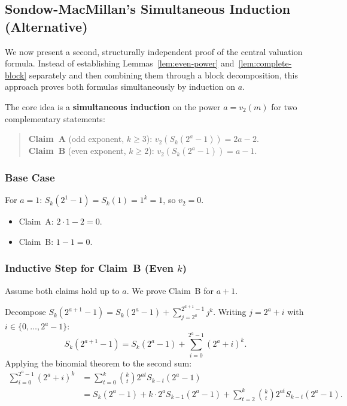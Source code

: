 \documentclass[12pt,a4paper]{article}
\theoremstyle{plain}
\theoremstyle{definition}
\begin{document}
\subsection{Sondow-MacMillan's Simultaneous Induction (Alternative)}
\label{sec:induction}

We now present a second, structurally independent proof of the central
valuation formula.  Instead of establishing Lemmas~\ref{lem:even-power}
and~\ref{lem:complete-block} separately and then combining them through a
block decomposition, this approach proves both formulas simultaneously
by induction on $a$.

The core idea is a \textbf{simultaneous induction} on the power $a = v_2(m)$
for two complementary statements:

\begin{quote}
  \textbf{Claim~A} (odd exponent, $k \ge 3$):
  $v_2(S_k(2^a - 1)) = 2a - 2$. \\[2pt]
  \textbf{Claim~B} (even exponent, $k \ge 2$):
  $v_2(S_k(2^a - 1)) = a - 1$.
\end{quote}

\subsubsection{Base Case}

For $a = 1$: $S_k(2^1 - 1) = S_k(1) = 1^k = 1$, so $v_2 = 0$.
\begin{itemize}[nosep]
  \item Claim~A: $2 \cdot 1 - 2 = 0$.~\checkmark
  \item Claim~B: $1 - 1 = 0$.~\checkmark
\end{itemize}

\subsubsection{Inductive Step for Claim~B (Even $k$)}

Assume both claims hold up to $a$.  We prove Claim~B for $a+1$.

Decompose $S_k(2^{a+1} - 1) = S_k(2^a - 1) + \sum_{j=2^a}^{2^{a+1}-1} j^k$.
Writing $j = 2^a + i$ with $i \in \{0, \dots, 2^a - 1\}$:
\[
  S_k(2^{a+1} - 1) = S_k(2^a - 1) + \sum_{i=0}^{2^a-1} (2^a + i)^k.
\]
Applying the binomial theorem to the second sum:
\begin{align*}
  \sum_{i=0}^{2^a-1} (2^a + i)^k
  &= \sum_{t=0}^{k} \binom{k}{t} 2^{at} S_{k-t}(2^a - 1) \\
  &= S_k(2^a - 1) + k \cdot 2^a S_{k-1}(2^a - 1)
     + \sum_{t=2}^{k} \binom{k}{t} 2^{at} S_{k-t}(2^a - 1).
\end{align*}
\end{document}
